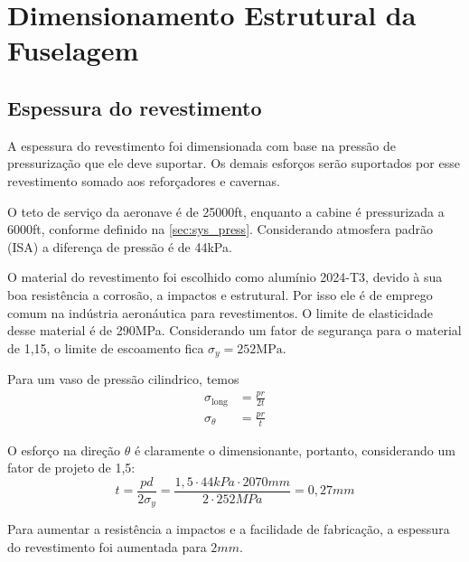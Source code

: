 \section{Dimensionamento Estrutural da Fuselagem}

\subsection{Espessura do revestimento}
A espessura do revestimento foi dimensionada com base na pressão de pressurização que ele deve suportar.
Os demais esforços serão suportados por esse revestimento somado aos reforçadores e cavernas.

O teto de serviço da aeronave é de 25000ft,
enquanto a cabine é pressurizada a 6000ft,
conforme definido na \autoref{sec:sys_press}.
Considerando atmosfera padrão (ISA) a diferença de pressão é de 44kPa.

O material do revestimento foi escolhido como alumínio 2024-T3, devido à sua boa resistência a corrosão, a impactos e estrutural.
Por isso ele é de emprego comum na indústria aeronáutica para revestimentos.
O limite de elasticidade desse material é de 290MPa.
Considerando um fator de segurança para o material de 1,15, o limite de escoamento fica $\sigma_y = 252\text{MPa}$.

Para um vaso de pressão cilindrico, temos
\begin{align}
\sigma_\text{long} &= \frac{pr}{2t} \\
\sigma_\theta      &= \frac{pr}{t}
\end{align}

O esforço na direção $\theta$ é claramente o dimensionante, portanto, considerando um fator de projeto de 1,5:
\begin{equation}
    t = \frac{pd}{2\sigma_y} = \frac{1,5 \cdot 44\si{kPa} \cdot 2070\si{mm}}{2 \cdot 252\si{MPa}} = 0,27\si{mm}
\end{equation}

Para aumentar a resistência a impactos e a facilidade de fabricação, a espessura do revestimento foi aumentada para $2\si{mm}$.
